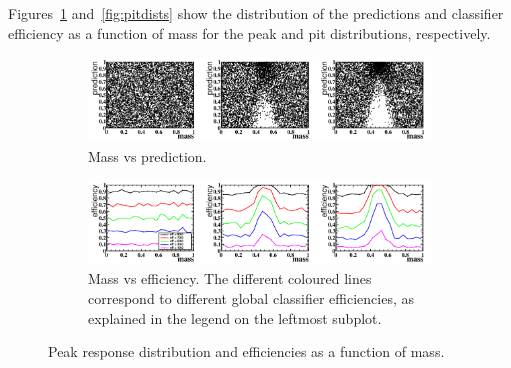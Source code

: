 Figures~\ref{fig:peakdists} and~\ref{fig:pitdists} show the distribution of the predictions
and classifier efficiency as a function of mass for the peak and pit distributions, respectively. 
\begin{figure}[h]
\centering
		\begin{subfigure}[b]{0.95\textwidth}
			\includegraphics[width=\textwidth]{graphs/PeakDistributions.png}
			\caption{Mass vs prediction.}
		\end{subfigure}
		\begin{subfigure}[b]{0.95\textwidth}
			\includegraphics[width=\textwidth]{graphs/PeakEffs.png}
			\caption{Mass vs efficiency. The different coloured lines correspond to
				different global classifier efficiencies, as explained in the legend on the leftmost subplot.}
		\end{subfigure}
		\caption{Peak response distribution and efficiencies as a function of mass. \label{fig:peakdists}}
\end{figure}

